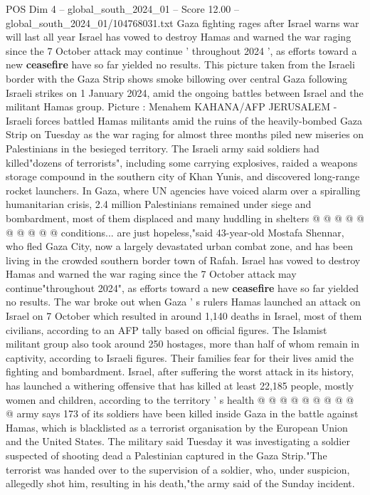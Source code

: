 \begin{textsample}{POS Dim 4 – global\_south\_2024\_01 – Score 12.00 – global\_south\_2024\_01/104768031.txt}  \label{ex:f4_pos_379}
Gaza fighting rages after Israel warns war will last all year Israel has vowed to destroy Hamas and warned the war raging since the 7 October attack may continue ' throughout 2024 ', as efforts toward a new \textbf{ceasefire} have so far yielded no results.
This picture taken from the Israeli border with the Gaza Strip shows smoke billowing over central Gaza following Israeli strikes on 1 January 2024, amid the ongoing battles between Israel and the militant Hamas group.
Picture : Menahem KAHANA/AFP JERUSALEM - Israeli forces battled Hamas militants amid the ruins of the heavily-bombed Gaza Strip on Tuesday as the war raging for almost three months piled new miseries on Palestinians in the besieged territory.
The Israeli army said soldiers had killed"dozens of terrorists", including some carrying explosives, raided a weapons storage compound in the southern city of Khan Yunis, and discovered long-range rocket launchers.
In Gaza, where UN agencies have voiced alarm over a spiralling humanitarian crisis, 2.4 million Palestinians remained under siege and bombardment, most of them displaced and many huddling in shelters @ @ @ @ @ @ @ @ @ @ conditions... are just hopeless,"said 43-year-old Mostafa Shennar, who fled Gaza City, now a largely devastated urban combat zone, and has been living in the crowded southern border town of Rafah.
Israel has vowed to destroy Hamas and warned the war raging since the 7 October attack may continue"throughout 2024", as efforts toward a new \textbf{ceasefire} have so far yielded no results.
The war broke out when Gaza ' s rulers Hamas launched an attack on Israel on 7 October which resulted in around 1,140 deaths in Israel, most of them civilians, according to an AFP tally based on official figures.
The Islamist militant group also took around 250 hostages, more than half of whom remain in captivity, according to Israeli figures.
Their families fear for their lives amid the fighting and bombardment.
Israel, after suffering the worst attack in its history, has launched a withering offensive that has killed at least 22,185 people, mostly women and children, according to the territory ' s health @ @ @ @ @ @ @ @ @ @ army says 173 of its soldiers have been killed inside Gaza in the battle against Hamas, which is blacklisted as a terrorist organisation by the European Union and the United States.
The military said Tuesday it was investigating a soldier suspected of shooting dead a Palestinian captured in the Gaza Strip."The terrorist was handed over to the supervision of a soldier, who, under suspicion, allegedly shot him, resulting in his death,"the army said of the Sunday incident.

\end{textsample}
